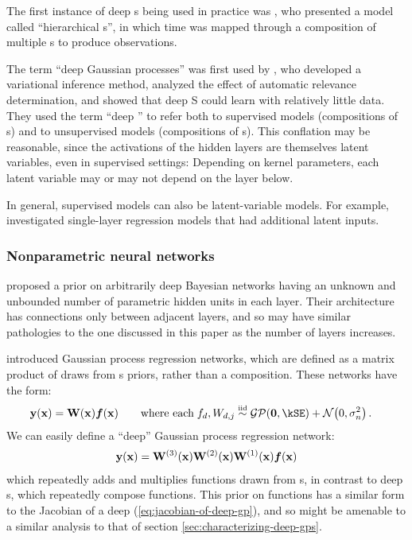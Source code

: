 \documentclass{article} %
\begin{document}
The first instance of deep \gp{}s being used in practice was \citep{lawrence2007hierarchical}, who presented a model called ``hierarchical \gplvm{}s'', in which time was mapped through a composition of multiple \gp{}s to produce observations.

The term ``deep Gaussian processes'' was first used by \citet{damianou2012deep}, who developed a variational inference method, analyzed the effect of automatic relevance determination, and showed that deep \gp{}S could learn with relatively little data.
%
They used the term ``deep \gp{}'' to refer both to supervised models (compositions of \gp{}s) and to unsupervised models (compositions of \gplvm{}s).
This conflation may be reasonable, since the activations of the hidden layers are themselves latent variables, even in supervised settings:
Depending on kernel parameters, each latent variable may or may not depend on the layer below.

In general, supervised models can also be latent-variable models.
For example, \citet{wang2012gaussian} investigated single-layer \gp{} regression models that had additional latent inputs.

\subsubsection{Nonparametric neural networks}
\citet{adams2010learning} proposed a prior on arbitrarily deep Bayesian networks having an unknown and unbounded number of parametric hidden units in each layer.
Their architecture has connections only between adjacent layers, and so may have similar pathologies to the one discussed in this paper as the number of layers increases.

\citet{wilson2012gaussian} introduced Gaussian process regression networks, which are defined as a matrix product of draws from \gp{}s priors, rather than a composition.
These networks have the form:
%
\begin{align}
\vy(\vx) & = \vW(\vx) \vf(\vx) \qquad \textnormal{where each} \; f_{d}, W_{d,j} \simiid \GPt{\vzero}{\kSE} + \Nt{0}{\sigma^2_n} .
\end{align}
%
We can easily define a ``deep'' Gaussian process regression network:
%
\begin{align}
{\bf{y}}({\bf{x}}) = \mathbf{W}^{(3)}({\bf{x}}) \mathbf{W}^{(2)}({\bf{x}}) \mathbf{W}^{(1)}({\bf{x}}) \boldsymbol{f}({\bf{x}})
\end{align}
%
which repeatedly adds and multiplies functions drawn from \gp{}s, in contrast to deep \gp{}s, which repeatedly compose functions.
This prior on functions has a similar form to the Jacobian of a deep \gp{} (\cref{eq:jacobian-of-deep-gp}), and so might be amenable to a similar analysis to that of section \ref{sec:characterizing-deep-gps}.
\end{document}
